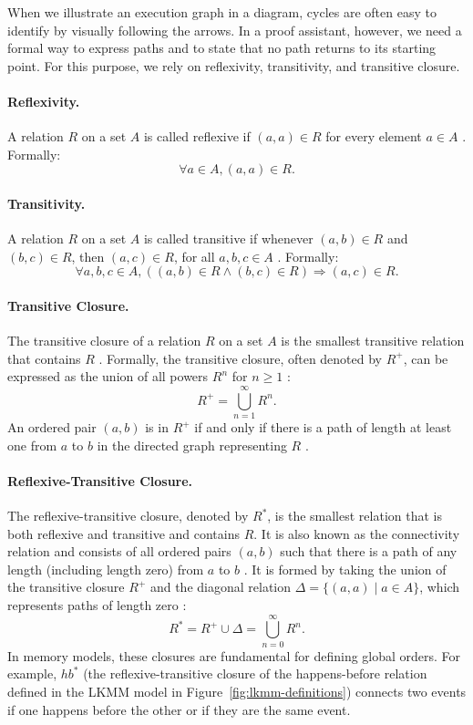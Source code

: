 When we illustrate an execution graph in a diagram, cycles are often easy to identify by visually following the arrows. In a proof assistant, however, we need a formal way to express paths and to state that no path returns to its starting point. For this purpose, we rely on reflexivity, transitivity, and transitive closure.

\paragraph{Reflexivity.}
A relation $R$ on a set $A$ is called reflexive if $(a, a) \in R$ for every element $a \in A$ \citep[p.~602]{rosen2012discrete}. Formally:
\[
\forall a \in A, (a, a) \in R.
\]

\paragraph{Transitivity.}
A relation $R$ on a set $A$ is called transitive if whenever $(a, b) \in R$ and $(b, c) \in R$, then $(a, c) \in R$, for all $a, b, c \in A$ \citep[p.~604]{rosen2012discrete}. Formally:
\[
\forall a, b, c \in A, ((a, b) \in R \land (b, c) \in R) \Rightarrow (a, c) \in R.
\]

\paragraph{Transitive Closure.}
The transitive closure of a relation $R$ on a set $A$ is the smallest transitive relation that contains $R$ \citep[p.~628]{rosen2012discrete}. Formally, the transitive closure, often denoted by $R^+$, can be expressed as the union of all powers $R^n$ for $n \ge 1$ \citep[p.~631]{rosen2012discrete}:
\[
R^+ = \bigcup_{n=1}^{\infty} R^n.
\]
An ordered pair $(a, b)$ is in $R^+$ if and only if there is a path of length at least one from $a$ to $b$ in the directed graph representing $R$ \citep[p.~631]{rosen2012discrete}.

\paragraph{Reflexive-Transitive Closure.}
The reflexive-transitive closure, denoted by $R^*$, is the smallest relation that is both reflexive and transitive and contains $R$. It is also known as the connectivity relation and consists of all ordered pairs $(a, b)$ such that there is a path of any length (including length zero) from $a$ to $b$ \citep[p.~631]{rosen2012discrete}. It is formed by taking the union of the transitive closure $R^+$ and the diagonal relation $\Delta = \{(a, a) \mid a \in A\}$, which represents paths of length zero \citep[p.~631]{rosen2012discrete}:
\[
R^* = R^+ \cup \Delta = \bigcup_{n=0}^{\infty} R^n.
\]
In memory models, these closures are fundamental for defining global orders. For example, $\mathit{hb}^*$ (the reflexive-transitive closure of the happens-before relation defined in the LKMM model in Figure~\ref{fig:lkmm-definitions}) connects two events if one happens before the other or if they are the same event.


